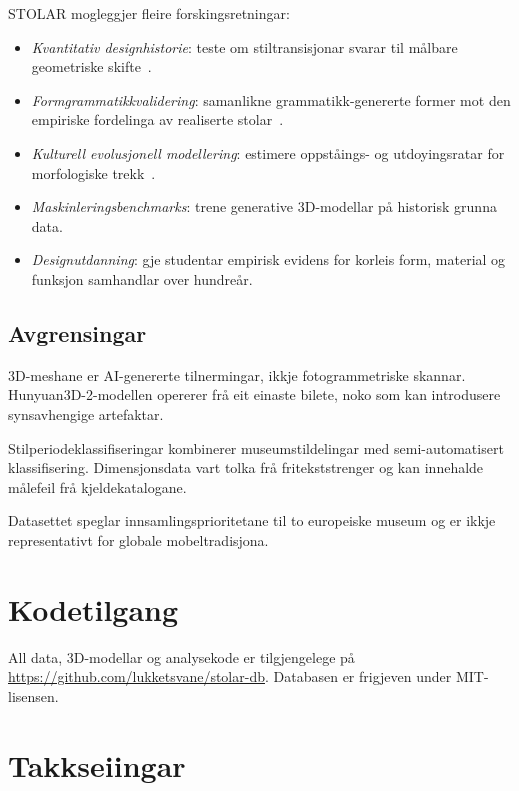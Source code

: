 STOLAR mogleggjer fleire forskingsretningar:

\begin{itemize}
\item \emph{Kvantitativ designhistorie}: teste om stiltransisjonar
      svarar til m\aa lbare geometriske skifte~\cite{kubler1962shape,thompson1917growth}.
\item \emph{Formgrammatikkvalidering}: samanlikne grammatikk-genererte former
      mot den empiriske fordelinga av realiserte stolar~\cite{stiny2006shape,knight1980hepplewhite}.
\item \emph{Kulturell evolusjonell modellering}: estimere oppst\aa ings- og utdoyingsratar
      for morfologiske trekk~\cite{kandler2019diversification}.
\item \emph{Maskinleringsbenchmarks}: trene generative 3D-modellar
      p\aa{} historisk grunna data.
\item \emph{Designutdanning}: gje studentar empirisk evidens
      for korleis form, material og funksjon samhandlar over hundre\aa r.
\end{itemize}

\subsection{Avgrensingar}

3D-meshane er AI-genererte tilnermingar, ikkje fotogrammetriske skannar.
Hunyuan3D-2-modellen opererer fr\aa{} eit einaste bilete,
noko som kan introdusere synsavhengige artefaktar.

Stilperiodeklassifiseringar kombinerer museumstildelingar
med semi-automatisert klassifisering.
Dimensjonsdata vart tolka fr\aa{} fritekststrenger
og kan innehalde m\aa lefeil fr\aa{} kjeldekatalogane.

Datasettet speglar innsamlingsprioritetane til to europeiske museum
og er ikkje representativt for globale mobeltradisjona.


\section{Kodetilgang}

All data, 3D-modellar og analysekode er tilgjengelege p\aa{}
\url{https://github.com/lukketsvane/stolar-db}.
Databasen er frigjeven under MIT-lisensen.

\section*{Takkseiingar}

